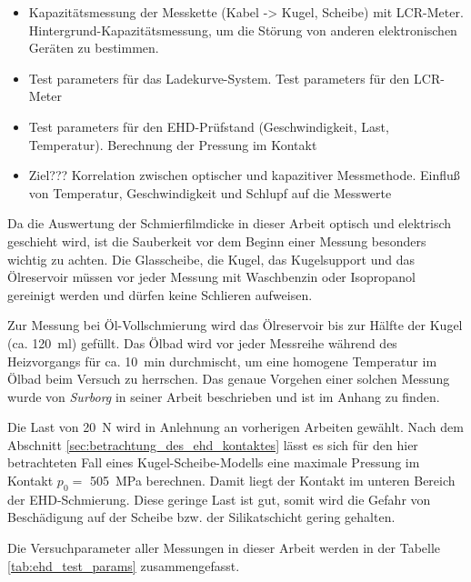 \begin{itemize}
    \item Kapazitätsmessung der Messkette (Kabel -> Kugel, Scheibe) mit LCR-Meter.
        Hintergrund-Kapazitätsmessung, um die Störung von anderen elektronischen Geräten zu bestimmen.
    \item Test parameters für das Ladekurve-System.
        Test parameters für den LCR-Meter
    \item Test parameters für den EHD-Prüfstand (Geschwindigkeit, Last, Temperatur).
        Berechnung der Pressung im Kontakt
    \item Ziel??? Korrelation zwischen optischer und kapazitiver Messmethode.
        Einfluß von Temperatur, Geschwindigkeit und Schlupf auf die Messwerte
\end{itemize}

Da die Auswertung der Schmierfilmdicke in dieser Arbeit optisch und elektrisch geschieht wird, ist die Sauberkeit vor dem Beginn einer Messung besonders wichtig zu achten.
Die Glasscheibe, die Kugel, das Kugelsupport und das Ölreservoir müssen vor jeder Messung mit Waschbenzin oder Isopropanol gereinigt werden und dürfen keine Schlieren aufweisen.

Zur Messung bei Öl-Vollschmierung wird das Ölreservoir bis zur Hälfte der Kugel (ca. \SI{120}{\ml}) gefüllt.
Das Ölbad wird vor jeder Messreihe während des Heizvorgangs für ca. \SI{10}{\minute} durchmischt, um eine homogene Temperatur im Ölbad beim Versuch zu herrschen.
Das genaue Vorgehen einer solchen Messung wurde von \textit{Surborg} in seiner Arbeit \cite{surborg_2007} beschrieben und ist im Anhang zu finden.

Die Last von \SI{20}{\newton} wird in Anlehnung an vorherigen Arbeiten gewählt.
Nach dem Abschnitt \ref{sec:betrachtung_des_ehd_kontaktes} lässt es sich für den hier betrachteten Fall eines Kugel-Scheibe-Modells eine maximale Pressung im Kontakt $p_0 =$ \SI{505}{\mega\pascal} berechnen.
Damit liegt der Kontakt im unteren Bereich der EHD-Schmierung.
Diese geringe Last ist gut, somit wird die Gefahr von Beschädigung auf der Scheibe bzw. der Silikatschicht gering gehalten.

Die Versuchparameter aller Messungen in dieser Arbeit werden in der Tabelle \ref{tab:ehd_test_params} zusammengefasst.


